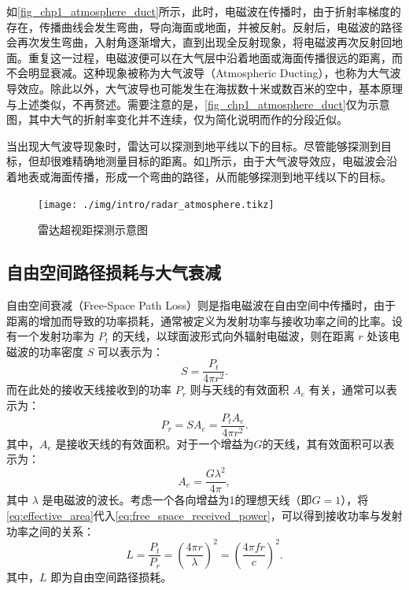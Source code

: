 如\cref{fig_chp1_atmosphere_duct}所示，此时，电磁波在传播时，由于折射率梯度的存在，传播曲线会发生弯曲，导向海面或地面，并被反射。反射后，电磁波的路径会再次发生弯曲，入射角逐渐增大，直到出现全反射现象，将电磁波再次反射回地面。重复这一过程，电磁波便可以在大气层中沿着地面或海面传播很远的距离，而不会明显衰减。这种现象被称为大气波导（Atmospheric Ducting），也称为大气波导效应。除此以外，大气波导也可能发生在海拔数十米或数百米的空中，基本原理与上述类似，不再赘述。需要注意的是，\cref{fig_chp1_atmosphere_duct}仅为示意图，其中大气的折射率变化并不连续，仅为简化说明而作的分段近似。

当出现大气波导现象时，雷达可以探测到地平线以下的目标。尽管能够探测到目标，但却很难精确地测量目标的距离。如\cref{fig_chp1_radar_ducting}所示，由于大气波导效应，电磁波会沿着地表或海面传播，形成一个弯曲的路径，从而能够探测到地平线以下的目标。
\begin{figure}[htb!]
    \centering
    \texttt{[image: ./img/intro/radar\_atmosphere.tikz]}
    \caption{雷达超视距探测示意图}
    \label{fig_chp1_radar_ducting}
\end{figure}

\subsection{自由空间路径损耗与大气衰减}

自由空间衰减（Free-Space Path Loss）则是指电磁波在自由空间中传播时，由于距离的增加而导致的功率损耗，通常被定义为发射功率与接收功率之间的比率。设有一个发射功率为 $P_t$ 的天线，以球面波形式向外辐射电磁波，则在距离 $r$ 处该电磁波的功率密度 $S$ 可以表示为：
\begin{equation*}
    S = \frac{P_t}{4 \pi r^2}.
    \label{eq:free_space_power_density}
\end{equation*}
而在此处的接收天线接收到的功率 $P_r$ 则与天线的有效面积 $A_e$ 有关，通常可以表示为：
\begin{equation}
    P_r = S A_e = \frac{P_t A_e}{4 \pi r^2}.
    \label{eq:free_space_received_power}
\end{equation}
其中，$A_e$ 是接收天线的有效面积。对于一个增益为\( G \)的天线，其有效面积可以表示为：
\begin{equation}
    A_e = \frac{G \lambda^2}{4 \pi},
    \label{eq:effective_area}
\end{equation}
其中 $\lambda$ 是电磁波的波长。考虑一个各向增益为1的理想天线（即$G=1$），将\cref{eq:effective_area}代入\cref{eq:free_space_received_power}，可以得到接收功率与发射功率之间的关系：
\begin{equation}
    L = \frac{P_t}{P_r} = \left( \frac{4 \pi r}{\lambda} \right)^2 = \left( \frac{4 \pi f r}{c} \right)^2.
    \label{eq:free_space_received_power_final}
\end{equation}
其中，$L$ 即为自由空间路径损耗。


